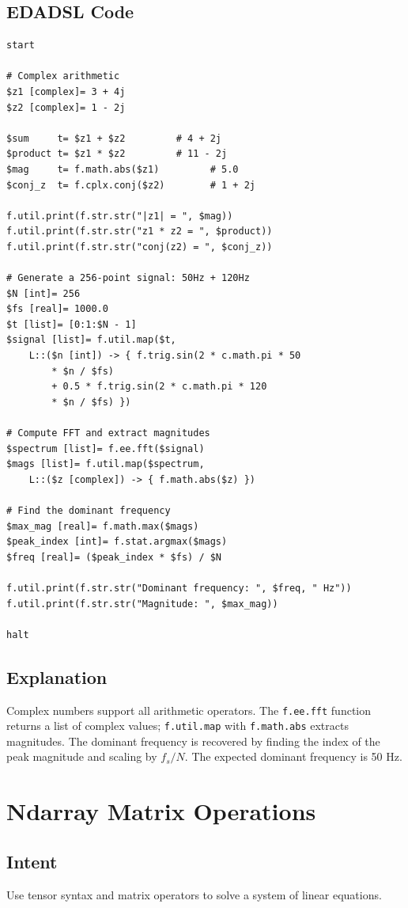 \subsection{EDADSL Code}
\begin{verbatim}
start

# Complex arithmetic
$z1 [complex]= 3 + 4j
$z2 [complex]= 1 - 2j

$sum     t= $z1 + $z2         # 4 + 2j
$product t= $z1 * $z2         # 11 - 2j
$mag     t= f.math.abs($z1)         # 5.0
$conj_z  t= f.cplx.conj($z2)        # 1 + 2j

f.util.print(f.str.str("|z1| = ", $mag))
f.util.print(f.str.str("z1 * z2 = ", $product))
f.util.print(f.str.str("conj(z2) = ", $conj_z))

# Generate a 256-point signal: 50Hz + 120Hz
$N [int]= 256
$fs [real]= 1000.0
$t [list]= [0:1:$N - 1]
$signal [list]= f.util.map($t,
    L::($n [int]) -> { f.trig.sin(2 * c.math.pi * 50
        * $n / $fs)
        + 0.5 * f.trig.sin(2 * c.math.pi * 120
        * $n / $fs) })

# Compute FFT and extract magnitudes
$spectrum [list]= f.ee.fft($signal)
$mags [list]= f.util.map($spectrum,
    L::($z [complex]) -> { f.math.abs($z) })

# Find the dominant frequency
$max_mag [real]= f.math.max($mags)
$peak_index [int]= f.stat.argmax($mags)
$freq [real]= ($peak_index * $fs) / $N

f.util.print(f.str.str("Dominant frequency: ", $freq, " Hz"))
f.util.print(f.str.str("Magnitude: ", $max_mag))

halt
\end{verbatim}

\subsection{Explanation}
Complex numbers support all arithmetic operators. The \texttt{f.ee.fft} function returns a list of complex values; \texttt{f.util.map} with \texttt{f.math.abs} extracts magnitudes. The dominant frequency is recovered by finding the index of the peak magnitude and scaling by $f_s / N$. The expected dominant frequency is 50 Hz.

\section{Ndarray Matrix Operations}
\subsection{Intent}
Use tensor syntax and matrix operators to solve a system of linear equations.

